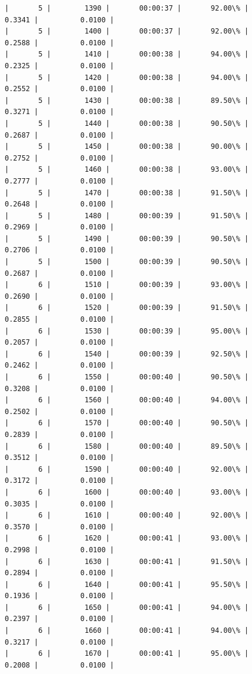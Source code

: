 \documentclass[11pt]{article}
\begin{document}
\begin{Verbatim}[commandchars=\\\{\}]
|       5 |        1390 |       00:00:37 |       92.00\% |       0.3341 |          0.0100 |
|       5 |        1400 |       00:00:37 |       92.00\% |       0.2588 |          0.0100 |
|       5 |        1410 |       00:00:38 |       94.00\% |       0.2325 |          0.0100 |
|       5 |        1420 |       00:00:38 |       94.00\% |       0.2552 |          0.0100 |
|       5 |        1430 |       00:00:38 |       89.50\% |       0.3271 |          0.0100 |
|       5 |        1440 |       00:00:38 |       90.50\% |       0.2687 |          0.0100 |
|       5 |        1450 |       00:00:38 |       90.00\% |       0.2752 |          0.0100 |
|       5 |        1460 |       00:00:38 |       93.00\% |       0.2777 |          0.0100 |
|       5 |        1470 |       00:00:38 |       91.50\% |       0.2648 |          0.0100 |
|       5 |        1480 |       00:00:39 |       91.50\% |       0.2969 |          0.0100 |
|       5 |        1490 |       00:00:39 |       90.50\% |       0.2706 |          0.0100 |
|       5 |        1500 |       00:00:39 |       90.50\% |       0.2687 |          0.0100 |
|       6 |        1510 |       00:00:39 |       93.00\% |       0.2690 |          0.0100 |
|       6 |        1520 |       00:00:39 |       91.50\% |       0.2855 |          0.0100 |
|       6 |        1530 |       00:00:39 |       95.00\% |       0.2057 |          0.0100 |
|       6 |        1540 |       00:00:39 |       92.50\% |       0.2462 |          0.0100 |
|       6 |        1550 |       00:00:40 |       90.50\% |       0.3208 |          0.0100 |
|       6 |        1560 |       00:00:40 |       94.00\% |       0.2502 |          0.0100 |
|       6 |        1570 |       00:00:40 |       90.50\% |       0.2839 |          0.0100 |
|       6 |        1580 |       00:00:40 |       89.50\% |       0.3512 |          0.0100 |
|       6 |        1590 |       00:00:40 |       92.00\% |       0.3172 |          0.0100 |
|       6 |        1600 |       00:00:40 |       93.00\% |       0.3035 |          0.0100 |
|       6 |        1610 |       00:00:40 |       92.00\% |       0.3570 |          0.0100 |
|       6 |        1620 |       00:00:41 |       93.00\% |       0.2998 |          0.0100 |
|       6 |        1630 |       00:00:41 |       91.50\% |       0.2894 |          0.0100 |
|       6 |        1640 |       00:00:41 |       95.50\% |       0.1936 |          0.0100 |
|       6 |        1650 |       00:00:41 |       94.00\% |       0.2397 |          0.0100 |
|       6 |        1660 |       00:00:41 |       94.00\% |       0.3217 |          0.0100 |
|       6 |        1670 |       00:00:41 |       95.00\% |       0.2008 |          0.0100 |

\end{Verbatim}
\end{document}
